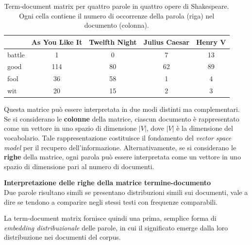 \begin{table}[h!]
\centering
\begin{tabular}{lcccc}
\hline
 & \textbf{As You Like It} & \textbf{Twelfth Night} & \textbf{Julius Caesar} & \textbf{Henry V} \\
\hline
battle & 1   & 0  & 7  & 13 \\
good   & 114 & 80 & 62 & 89 \\
fool   & 36  & 58 & 1  & 4  \\
wit    & 20  & 15 & 2  & 3  \\
\hline
\end{tabular}
\caption{Term-document matrix per quattro parole in quattro opere di Shakespeare. Ogni cella contiene il numero di occorrenze della parola (riga) nel documento (colonna).}
\label{tab:term_document_shakespeare}
\end{table}
Questa matrice può essere interpretata in due modi distinti ma complementari. Se si considerano le \textbf{colonne} della matrice, ciascun documento è rappresentato come un vettore in uno spazio di dimensione $|V|$, dove $|V|$ è la dimensione del vocabolario. Tale rappresentazione costituisce il fondamento del \emph{vector space model} per il recupero dell'informazione. 
Alternativamente, se si considerano le \textbf{righe} della matrice, ogni parola può essere interpretata come un vettore in uno spazio di dimensione pari al numero di documenti.
\begin{notebox}
\textbf{Interpretazione delle righe della matrice termine-documento}\\
Due parole risultano simili se presentano distribuzioni simili sui documenti, vale a dire se tendono a comparire negli stessi testi con frequenze comparabili.
\end{notebox}
La term-document matrix fornisce quindi una prima, semplice forma di \emph{embedding distribuzionale} delle parole, in cui il significato emerge dalla loro distribuzione nei documenti del corpus.
